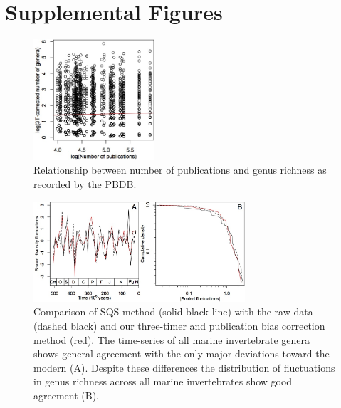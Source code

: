 \documentclass[12pt]{article}
\let\citep=\cite
\begin{document}
\section*{Supplemental Figures}

\begin{figure}[!hp]
  \centering
  \includegraphics[width=0.4\textwidth]{figs/figSupp_divByPub.jpg}
  \caption[Relationship between number of publications and genus
  richness]{Relationship between number of publications and genus
    richness as recorded by the PBDB.}
  \label{fig:divByPub}
\end{figure}

\begin{figure}[!hp]
  \centering
  \includegraphics[width=0.7\textwidth]{figs/figSupp_sqsRaw3tpub.jpg}
  \caption[Comparison of SQS method with the raw data and three-timer
  bias correction method]{Comparison of SQS method \citep{alroy2010}
    (solid black line) with the raw data (dashed black) and our
    three-timer and publication bias correction method (red). The
    time-series of all marine invertebrate genera shows general
    agreement with the only major deviations toward the modern
    (A). Despite these differences the distribution of fluctuations in
    genus richness across all marine invertebrates show good
    agreement (B).}
  \label{fig:supp_3TPub}
\end{figure}
\end{document}
